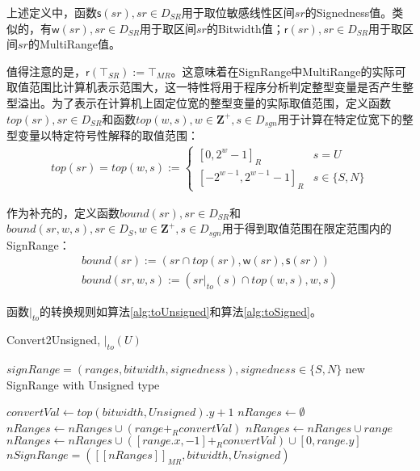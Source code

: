 上述定义中，函数$ \mathsf{s}(sr), sr \in D_{SR}$用于取位敏感线性区间$ sr $的Signedness值。类似的，有$ \mathsf{w}(sr), sr \in D_{SR} $用于取区间$ sr $的Bitwidth值；$ \mathsf{r}(sr), sr \in D_{SR} $用于取区间$ sr $的MultiRange值。


值得注意的是，$ \mathsf{r}(\top_{SR}) := \top_{MR} $。这意味着在SignRange中MultiRange的实际可取值范围比计算机表示范围大，这一特性将用于程序分析判定整型变量是否产生整型溢出。为了表示在计算机上固定位宽的整型变量的实际取值范围，定义函数$ top(sr), sr \in D_{SR} $和函数$ top(w, s), w \in \mathbf{Z^+}, s \in D_{sgn} $用于计算在特定位宽下的整型变量以特定符号性解释的取值范围：
\begin{align}
	top(sr)  = top(w, s):=  \begin{cases}
		[0, 2^{w} - 1]_{R} & s = U\\
		[-2^{w - 1}, 2^{w - 1} - 1]_{R} & s \in \{S, N\}
	\end{cases}
\end{align}

作为补充的，定义函数$ bound(sr), sr \in D_{SR}$和$ bound(sr, w, s), sr \in D_S, w \in \mathbf{Z^+}, s \in D_{sgn}  $用于得到取值范围在限定范围内的SignRange：
\begin{align}
	bound(sr) := (sr \cap top(sr), \mathsf{w}(sr), \mathsf{s}(sr))\\
	bound(sr, w, s) := (sr|_{to}(s) \cap top(w, s), w, s)
\end{align}

函数$ |_{to} $的转换规则如算法\ref{alg:toUnsigned}和算法\ref{alg:toSigned}。

\begin{breakablealgorithm}
	\caption{Convert2Unsigned, $ |_{to}(U) $}
	\label{alg:toUnsigned}
	\begin{algorithmic}[1]
		
		\Require $ signRange = (ranges, bitwidth, signedness) , signedness \in \{S, N\}$
		\Ensure new SignRange with Unsigned type
		
		\State $ convertVal \gets top(bitwidth, Unsigned).y + 1 $
		\State $ nRanges \gets \emptyset $
				\State $ nRanges \gets nRanges \cup (range +_R convertVal) $
				\State $ nRanges \gets nRanges \cup range $
			\Else
				\State $ nRanges \gets nRanges \cup ([range.x, -1] +_R convertVal) \cup [0, range.y] $
			\EndIf
		\EndFor
		\\\Return $ nSignRange = ([[nRanges]]_{MR}, bitwidth, Unsigned) $
	\end{algorithmic}
\end{breakablealgorithm}

